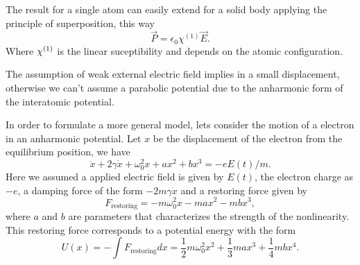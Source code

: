 The result for a single atom can easily extend for a solid body applying the principle of  superposition, this way
\begin{equation}
    \vec{P} = \epsilon_0\chi^{(1)}\vec{E}.
\end{equation}
Where $\chi^{( 1)}$ is the linear suceptibility and depends on the atomic configuration.

The assumption of weak external electric field implies in a small displacement, otherwise we can't assume a parabolic potential due to the anharmonic form of the interatomic potential. 

In order to formulate a more general model, lets consider the motion of a electron in an anharmonic potential. Let $x$ be the displacement of the electron from the equilibrium position, we have
\begin{equation}
    \ddot{x} + 2\gamma\dot{x} + \omega_0^2x+ax^2+bx^3 = -eE(t)/m.
    \label{eq:motion_equation_electron}
\end{equation}
Here we assumed a applied electric field is given by $E(t)$, the electron charge as $-e$, a damping force of the form $-2m\gamma\dot{x}$ and a restoring force given by
\begin{equation}
    F_\text{restoring} = -m\omega_0^2x -max^2 -mbx^3, 
\end{equation}
where $a$ and $b$ are parameters that characterizes the strength of the nonlinearity. This restoring force corresponds to a potential energy with the form 
\begin{equation}
    U(x) = -\int F_\text{restoring} dx = \frac{1}{2}m\omega_0^2x^2 +\frac{1}{3}max^3 +\frac{1}{4}mbx^4.
\end{equation}

